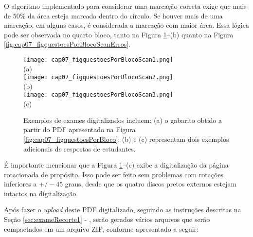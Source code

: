 O algoritmo implementado para considerar uma marcação correta exige que mais de 50\% da área esteja marcada dentro do círculo. Se houver mais de uma marcação, em alguns casos, é considerada a marcação com maior área. Essa lógica pode ser observada no quarto bloco, tanto na Figura \ref{fig:cap07_figquestoesPorBlocoScan}--(b) quanto na Figura \ref{fig:cap07_figquestoesPorBlocoScanErros}.


\begin{figure}[htbp]
\centering
\texttt{[image: cap07\_figquestoesPorBlocoScan1.png]}\\(a)\\
\texttt{[image: cap07\_figquestoesPorBlocoScan2.png]}\\(b)\\
\texttt{[image: cap07\_figquestoesPorBlocoScan3.png]}\\(c)
\caption{Exemplos de exames digitalizados incluem: (a) o gabarito obtido a partir do PDF apresentado na Figura \ref{fig:cap07_figquestoesPorBloco}; (b) e (c) representam dois exemplos adicionais de respostas de estudantes.}
\label{fig:cap07_figquestoesPorBlocoScan}
\end{figure}

É importante mencionar que a Figura \ref{fig:cap07_figquestoesPorBlocoScan}--(c) exibe a digitalização da página rotacionada de propósito. Isso pode ser feito sem problemas com rotações inferiores a $+/- 45$ graus, desde que os quatro discos pretos externos estejam intactos na digitalização.


Após fazer o \textit{upload} deste PDF digitalizado, seguindo as instruções descritas na Seção \ref{sec:exameRecorte1} - , serão gerados vários arquivos que serão compactados em um arquivo ZIP, conforme apresentado a seguir:


